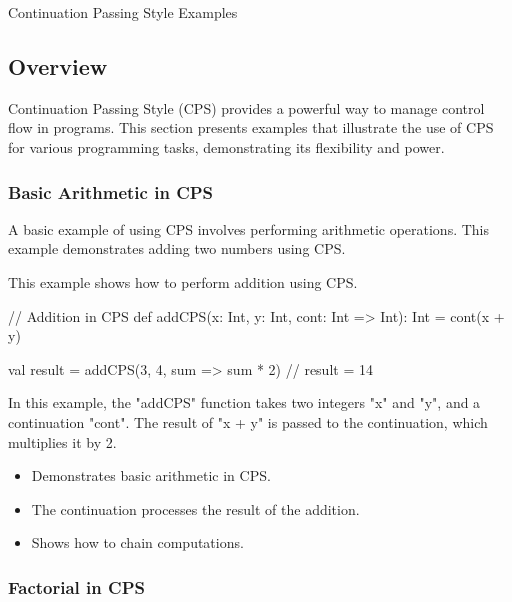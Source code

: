\begin{notes}{Continuation Passing Style Examples}
    \subsection*{Overview}

    Continuation Passing Style (CPS) provides a powerful way to manage control flow in programs. This section presents examples that illustrate the use of CPS for various programming tasks, 
    demonstrating its flexibility and power.
    
    \subsubsection*{Basic Arithmetic in CPS}
    
    A basic example of using CPS involves performing arithmetic operations. This example demonstrates adding two numbers using CPS.
    
    \begin{highlight}
    
        This example shows how to perform addition using CPS.
    
    \begin{code}[Scala]
    // Addition in CPS
    def addCPS(x: Int, y: Int, cont: Int => Int): Int = cont(x + y)
    
    val result = addCPS(3, 4, sum => sum * 2)  // result = 14
    \end{code}
    
        In this example, the "addCPS" function takes two integers "x" and "y", and a continuation "cont". The result of "x + y" is passed to the continuation, which multiplies it by 2.
    
        \begin{itemize}
            \item Demonstrates basic arithmetic in CPS.
            \item The continuation processes the result of the addition.
            \item Shows how to chain computations.
        \end{itemize}
    
    \end{highlight}
    
    \subsubsection*{Factorial in CPS}
    

\end{notes}
